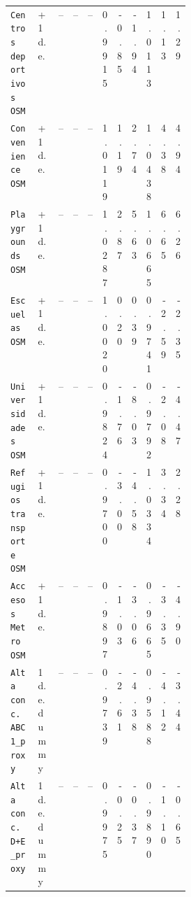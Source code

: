 \begin{landscape}
\begin{longtable}{p{0.18\linewidth}p{0.12\linewidth}rrrrrrrrr}
\texttt{Centros deportivos OSM} & +1 d.e. & -- & -- & -- & 0.9915 & -0.85 & -1.94 & 1.0113 & 1.13 & 1.29 \\
\texttt{Convenience OSM} & +1 d.e. & -- & -- & -- & 1.0119 & 1.19 & 2.74 & 1.0438 & 4.38 & 4.94 \\
\texttt{Playgrounds OSM} & +1 d.e. & -- & -- & -- & 1.0287 & 2.87 & 5.63 & 1.0665 & 6.65 & 6.26 \\
\texttt{Escuelas OSM} & +1 d.e. & -- & -- & -- & 1.0020 & 0.20 & 0.39 & 0.9741 & -2.59 & -2.35 \\
\texttt{Universidades OSM} & +1 d.e. & -- & -- & -- & 0.9824 & -1.76 & -8.03 & 0.9792 & -2.08 & -4.47 \\
\texttt{Refugios transporte OSM} & +1 d.e. & -- & -- & -- & 0.9700 & -3.00 & -4.58 & 1.0334 & 3.34 & 2.28 \\
\texttt{Accesos Metro OSM} & +1 d.e. & -- & -- & -- & 0.9897 & -1.03 & -3.06 & 0.9665 & -3.35 & -4.90 \\
\texttt{Alta conc. ABC1\_proxy} & 1 d.e. dummy & -- & -- & -- & 0.9739 & -2.61 & -4.38 & 0.9588 & -4.12 & -3.44 \\
\texttt{Alta conc. D+E\_proxy} & 1 d.e. dummy & -- & -- & -- & 0.9975 & -0.25 & -0.37 & 0.9890 & -1.10 & -0.65 \\

\end{longtable}
\end{landscape}
